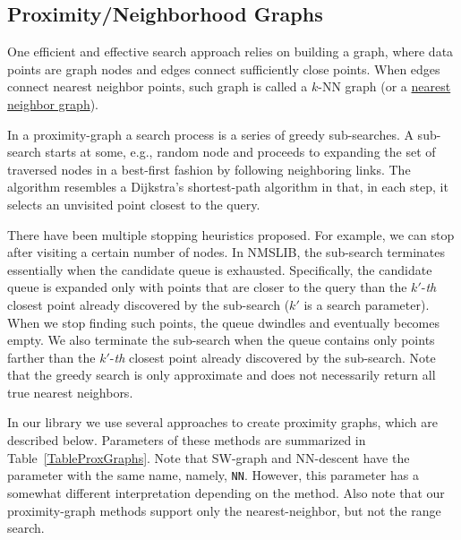 \documentclass[runningheads,a4paper]{llncs}
\newcommand{\ttt}[1]{\texttt{#1}}
\newcommand{\knn}{$k$-NN }
\begin{document}
\subsection{Proximity/Neighborhood Graphs} \label{SectionProxGraph}
One efficient and effective search approach
relies on building a graph, where data points are graph nodes and edges connect sufficiently close points.
When edges connect nearest neighbor points, such graph is called a \knn graph (or a \href{https://en.wikipedia.org/wiki/Nearest_neighbor_graph}{nearest neighbor graph}).

In a proximity-graph a search process is a series of greedy sub-searches.
A sub-search starts at some, e.g., random node and proceeds to expanding the set of traversed nodes in a best-first fashion by following neighboring links. 
The algorithm resembles a Dijkstra's shortest-path algorithm in that, in each step, 
it selects an unvisited point closest to the query. 

There have been multiple stopping heuristics proposed.
For example, we can stop after visiting a certain number of nodes.
In NMSLIB, the sub-search terminates essentially when the candidate queue is exhausted.
Specifically, the candidate queue is expanded only with points that are closer to the query than the $k'$-\textit{th} closest point already discovered by the sub-search ($k'$ is a search parameter).
When we stop finding such points, the queue dwindles and eventually becomes empty. 
We also terminate the sub-search when the queue contains only points farther than the $k'$-\textit{th} closest point already discovered by the sub-search.
Note that the greedy search is only approximate and does not necessarily return all true nearest neighbors.

In our library we use several approaches to create proximity graphs, which are described below.
Parameters of these methods are summarized in Table~\ref{TableProxGraphs}.
Note that SW-graph and NN-descent have the parameter with the same name, namely, \ttt{NN}.
However, this parameter has a somewhat different interpretation depending on the method.
Also note that our proximity-graph methods support only the nearest-neighbor, but not the range search.
\end{document}

